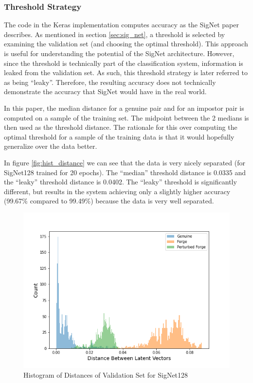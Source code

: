 \subsubsection{Threshold Strategy}\label{sec:threshold}

The code in the Keras implementation computes accuracy as the SigNet paper describes.
As mentioned in section \ref{sec:sig_net}, a threshold is selected by examining the validation set (and choosing the optimal threshold).
This approach is useful for understanding the potential of the SigNet architecture.
However, since the threshold is technically part of the classification system, information is leaked from the validation set.
As such, this threshold strategy is later referred to as being ``leaky''.
Therefore, the resulting accuracy does not technically demonstrate the accuracy that SigNet would have in the real world.

In this paper, the median distance for a genuine pair and for an impostor pair is computed on a sample of the training set.
The midpoint between the 2 medians is then used as the threshold distance.
The rationale for this over computing the optimal threshold for a sample of the training data is that it would hopefully generalize over the data better.

In figure \ref{fig:hist_distance} we can see that the data is very nicely separated (for SigNet128 trained for 20 epochs).
The ``median'' threshold distance is 0.0335 and the ``leaky'' threshold distance is 0.0402.
The ``leaky'' threshold is significantly different, but results in the system achieving only a slightly higher accuracy (99.67\% compared to 99.49\%) because the data is very well separated.
\begin{figure}[h]
    \begin{center}
        \includegraphics[width=0.8\linewidth]{distance_histogram_signet_128.png}
    \end{center}
    \caption{Histogram of Distances of Validation Set for SigNet128}
    \label{fig:hist_distances}
\end{figure}


